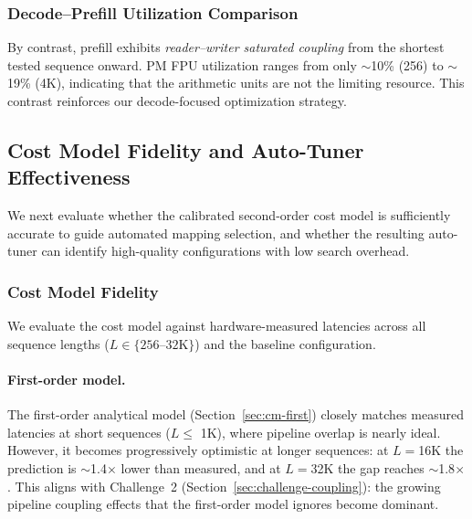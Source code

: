 \documentclass[sigconf, review, anonymous]{acmart}
\newcommand{\autoTuner}{auto-tuner}
\newcommand{\AutoTuner}{Auto-Tuner}
\begin{document}
\subsubsection{Decode--Prefill Utilization Comparison}\label{sec:eval-prefill}

By contrast, prefill exhibits \emph{reader--writer saturated coupling}
from the shortest tested sequence onward.  PM FPU utilization ranges
from only $\sim$10\% (256) to $\sim$19\% (4K), indicating that the
arithmetic units are not the limiting resource.  This contrast
reinforces our decode-focused optimization strategy.



\subsection{Cost Model Fidelity and \AutoTuner{} Effectiveness}\label{sec:eval-tuner}

We next evaluate whether the calibrated second-order cost model is
sufficiently accurate to guide automated mapping selection, and whether
the resulting \autoTuner{} can identify high-quality configurations with
low search overhead.


\subsubsection{Cost Model Fidelity}\label{sec:eval-accuracy}


We evaluate the cost model against hardware-measured latencies across
all sequence lengths ($L \in \{256\text{--}32\text{K}\}$) and the
baseline configuration.

\paragraph{First-order model.}
The first-order analytical model (Section~\ref{sec:cm-first}) closely
matches measured latencies at short sequences ($L \leq$ 1K), where
pipeline overlap is nearly ideal.  However, it becomes progressively
optimistic at longer sequences: at $L{=}$16K the prediction is
$\sim$1.4$\times$ lower than measured, and at $L{=}$32K the gap
reaches $\sim$1.8$\times$.  This aligns with Challenge~2
(Section~\ref{sec:challenge-coupling}): the growing pipeline coupling
effects that the first-order model ignores become dominant.
\end{document}
